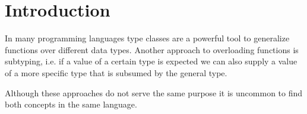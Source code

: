 
\chapter{Introduction}\label{ch:intro}

In many programming languages type classes are a powerful tool to generalize functions over different data types.
Another approach to overloading functions is subtyping, i.e. if a value of a certain type is expected we can also supply a value of a more specific type that is subsumed by the general type.

Although these approaches do not serve the same purpose it is uncommon to find both concepts in the same language.